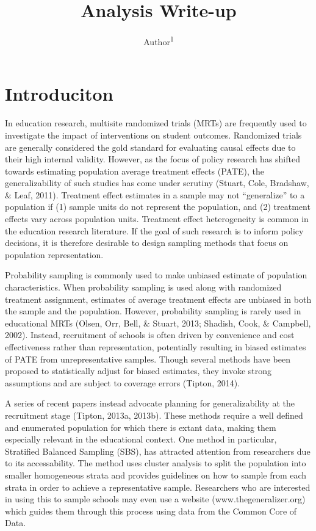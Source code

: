 \documentclass[,man]{apa6}
\title{Analysis Write-up}
\author{Author\textsuperscript{1}}
\date{}
\affiliation{
\vspace{0.5cm}
\textsuperscript{1} School}
\theoremstyle{definition}
\theoremstyle{definition}
\theoremstyle{definition}
\theoremstyle{remark}
\begin{document}
\maketitle

\hypertarget{introduciton}{%
\section{Introduciton}\label{introduciton}}

In education research, multisite randomized trials (MRTs) are frequently
used to investigate the impact of interventions on student outcomes.
Randomized trials are generally considered the gold standard for
evaluating causal effects due to their high internal validity. However,
as the focus of policy research has shifted towards estimating
population average treatment effects (PATE), the generalizability of
such studies has come under scrutiny (Stuart, Cole, Bradshaw, \& Leaf,
2011). Treatment effect estimates in a sample may not
\enquote{generalize} to a population if (1) sample units do not
represent the population, and (2) treatment effects vary across
population units. Treatment effect heterogeneity is common in the
education research literature. If the goal of such research is to inform
policy decisions, it is therefore desirable to design sampling methods
that focus on population representation.

Probability sampling is commonly used to make unbiased estimate of
population characteristics. When probability sampling is used along with
randomized treatment assignment, estimates of average treatment effects
are unbiased in both the sample and the population. However, probability
sampling is rarely used in educational MRTs (Olsen, Orr, Bell, \&
Stuart, 2013; Shadish, Cook, \& Campbell, 2002). Instead, recruitment of
schools is often driven by convenience and cost effectiveness rather
than representation, potentially resulting in biased estimates of PATE
from unrepresentative samples. Though several methods have been proposed
to statistically adjust for biased estimates, they invoke strong
assumptions and are subject to coverage errors (Tipton, 2014).

A series of recent papers instead advocate planning for generalizability
at the recruitment stage (Tipton, 2013a, 2013b). These methods require a
well defined and enumerated population for which there is extant data,
making them especially relevant in the educational context. One method
in particular, Stratified Balanced Sampling (SBS), has attracted
attention from researchers due to its accessability. The method uses
cluster analysis to split the population into smaller homogeneous strata
and provides guidelines on how to sample from each strata in order to
achieve a representative sample. Researchers who are interested in using
this to sample schools may even use a website (www.thegeneralizer.org)
which guides them through this process using data from the Common Core
of Data.
\end{document}
